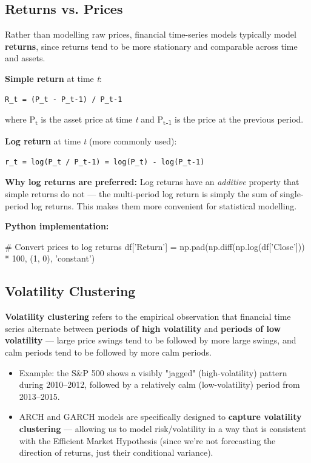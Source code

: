 \documentclass[12pt,openany]{book}
\theoremstyle{definition}
\theoremstyle{remark}
\begin{document}
\subsection{Returns vs. Prices}

Rather than modelling raw prices, financial time-series models typically model \textbf{returns}, since returns tend to be more stationary and comparable across time and assets.

\textbf{Simple return} at time \emph{t}:

\begin{lstlisting}[style=notesCode]
R_t = (P_t - P_t-1) / P_t-1
\end{lstlisting}

where P\textsubscript{t} is the asset price at time \emph{t} and P\textsubscript{t}\textsubscript{-}\textsubscript{1} is the price at the previous period.

\textbf{Log return} at time \emph{t} (more commonly used):

\begin{lstlisting}[style=notesCode]
r_t = log(P_t / P_t-1) = log(P_t) - log(P_t-1)
\end{lstlisting}

\textbf{Why log returns are preferred:} Log returns have an \emph{additive} property that simple returns do not — the multi-period log return is simply the sum of single-period log returns. This makes them more convenient for statistical modelling.

\textbf{Python implementation:}
\begin{python}
# Convert prices to log returns
df['Return'] = np.pad(np.diff(np.log(df['Close'])) * 100, (1, 0), 'constant')
\end{python}

\subsection{Volatility Clustering}

\textbf{Volatility clustering} refers to the empirical observation that financial time series alternate between \textbf{periods of high volatility} and \textbf{periods of low volatility} — large price swings tend to be followed by more large swings, and calm periods tend to be followed by more calm periods.

\begin{itemize}
\item Example: the S\&P 500 shows a visibly "jagged" (high-volatility) pattern during 2010–2012, followed by a relatively calm (low-volatility) period from 2013–2015.
\item ARCH and GARCH models are specifically designed to \textbf{capture volatility clustering} — allowing us to model risk/volatility in a way that is consistent with the Efficient Market Hypothesis (since we're not forecasting the direction of returns, just their conditional variance).
\end{itemize}
\end{document}
